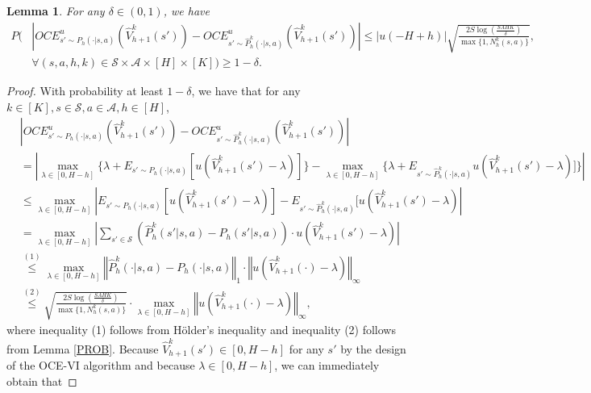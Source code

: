 \documentclass[11pt]{article}
\newtheorem{lemma}{Lemma}
\newcommand{\1}{\mathbbm{1}}
\newcommand{\gao}[1]{\textcolor{blue}{{#1}}} %
\begin{document}
\begin{lemma}\label{LP4}
For any $\delta\in (0,1)$, we have  %
\begin{equation}
\begin{aligned}
P\Bigg( & \left\vert OCE^{u}_{s'\sim P_h(\cdot\vert s,a)}(\hat{V}_{h+1}^k(s'))-OCE^{u}_{s'\sim \hat{P}^k_h(\cdot\vert s,a)}(\hat{V}_{h+1}^k(s')) \right\vert \leq \vert u(-H+h)\vert\sqrt{\frac{2S\log\left (\frac{SAHK}{\delta}\right )}{\max\{1,N_h^k(s,a)\}}},\\
&\forall (s,a,h,k)\in \mathcal{S}\times \mathcal{A}\times [H]\times [K]\Bigg)\geq 1-\delta.
\end{aligned}
\end{equation}
\end{lemma}
\begin{proof}
With probability at least $1-\delta$, we have that for any $k\in [K],s\in \mathcal{S},a\in \mathcal{A}, h\in [H]$,
\begin{align*}
&\left|OCE^{u}_{s'\sim P_h(\cdot\vert s,a)}(\hat{V}_{h+1}^k(s'))-OCE^{u}_{s'\sim \hat{P}^k_h(\cdot\vert s,a)}(\hat{V}_{h+1}^k(s'))\right|\\
&= \left| \max_{\lambda\in [0,H-h]}\{\lambda+E_{s'\sim P_h(\cdot\vert s,a)}[u(\hat{V}_{h+1}^k(s')-\lambda)]\}-\max_{\lambda\in [0,H-h]}\{\lambda+E_{s'\sim \hat{P}^k_h(\cdot\vert s,a)} u(\hat{V}_{h+1}^k(s')-\lambda)]\}\right| \\
&\leq  \max_{\lambda\in [0,H-h]}\left| E_{s'\sim P_h(\cdot\vert s,a)}[u(\hat{V}_{h+1}^k(s')-\lambda)]-E_{s'\sim \hat{P}^k_h(\cdot\vert s,a)}[u(\hat{V}_{h+1}^k(s')-\lambda) \right|\\
&=\max_{\lambda\in [0,H-h]}\left\vert \sum_{s'\in\mathcal{S}}\left(\hat{P}_h^k(s'\vert s,a)-P_h(s'\vert s,a)\right)\cdot u(\hat{V}_{h+1}^k(s')-\lambda)\right\vert\\
&\overset{(1)}{\leq} \max_{\lambda\in [0,H-h]}\left\Vert \hat{P}_h^k(\cdot\vert s,a)-P_h(\cdot\vert s,a)\right\Vert_1 \cdot\left\Vert u(\hat{V}_{h+1}^k(\cdot)-\lambda)\right\Vert_{\infty}\\
&\overset{(2)}{\leq} \sqrt{\frac{2S\log\left(\frac{SAHK}{\delta}\right)}{\max\{1,N_h^k(s,a)\}}}\cdot \max_{\lambda\in [0,H-h]}\left\Vert u(\hat{V}_{h+1}^k(\cdot)-\lambda)\right\Vert_{\infty},
\end{align*}
where inequality (1) follows from H\"{o}lder's inequality and inequality (2) follows from Lemma \ref{PROB}. Because $\hat{V}_{h+1}^k(s') \in [0, H-h]$ for any $s'$ by the design of the OCE-VI algorithm and because $\lambda \in [0, H-h]$, we can immediately obtain that  

\end{proof}
\end{document}
